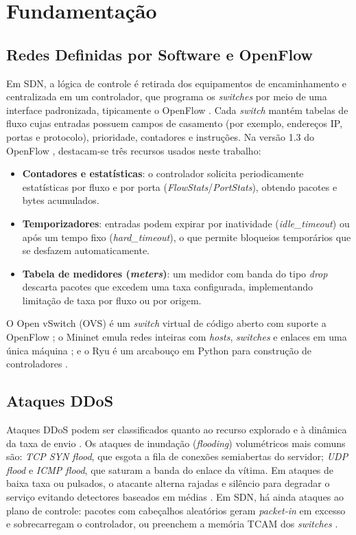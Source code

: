 \documentclass[12pt]{article}
\begin{document}
\section{Fundamentação}\label{sec:fund}

\subsection{Redes Definidas por Software e OpenFlow}

Em SDN, a lógica de controle é retirada dos equipamentos de encaminhamento e
centralizada em um controlador, que programa os \textit{switches} por meio de
uma interface padronizada, tipicamente o OpenFlow
\cite{mckeown2008openflow,kreutz2015sdn}. Cada \textit{switch} mantém tabelas
de fluxo cujas entradas possuem campos de casamento (por exemplo, endereços IP,
portas e protocolo), prioridade, contadores e instruções. Na versão 1.3 do
OpenFlow \cite{onf2012openflow13}, destacam-se três recursos usados neste
trabalho:
\begin{itemize}
  \item \textbf{Contadores e estatísticas}: o controlador solicita
        periodicamente estatísticas por fluxo e por porta
        (\textit{FlowStats}/\textit{PortStats}), obtendo pacotes e bytes
        acumulados.
  \item \textbf{Temporizadores}: entradas podem expirar por inatividade
        (\textit{idle\_timeout}) ou após um tempo fixo (\textit{hard\_timeout}),
        o que permite bloqueios temporários que se desfazem automaticamente.
  \item \textbf{Tabela de medidores (\textit{meters})}: um medidor com banda do
        tipo \textit{drop} descarta pacotes que excedem uma taxa configurada,
        implementando limitação de taxa por fluxo ou por origem.
\end{itemize}
O Open vSwitch (OVS) é um \textit{switch} virtual de código aberto com suporte a
OpenFlow \cite{pfaff2015ovs}; o Mininet emula redes inteiras com
\textit{hosts}, \textit{switches} e enlaces em uma única máquina
\cite{lantz2010mininet}; e o Ryu é um arcabouço em Python para construção de
controladores \cite{ryu}.

\subsection{Ataques DDoS}

Ataques DDoS podem ser classificados quanto ao recurso explorado e à dinâmica
da taxa de envio \cite{mirkovic2004taxonomy}. Os ataques de inundação
(\textit{flooding}) volumétricos mais comuns são: \textit{TCP SYN flood}, que
esgota a fila de conexões semiabertas do servidor; \textit{UDP flood} e
\textit{ICMP flood}, que saturam a banda do enlace da vítima. Em ataques de
baixa taxa ou pulsados, o atacante alterna rajadas e silêncio para degradar o
serviço evitando detectores baseados em médias \cite{kuzmanovic2003shrew}. Em
SDN, há ainda ataques ao plano de controle: pacotes com cabeçalhos aleatórios
geram \textit{packet-in} em excesso e sobrecarregam o controlador, ou preenchem
a memória TCAM dos \textit{switches} \cite{yan2016sdnddos,albuquerque2023slowtcam}.
\end{document}

